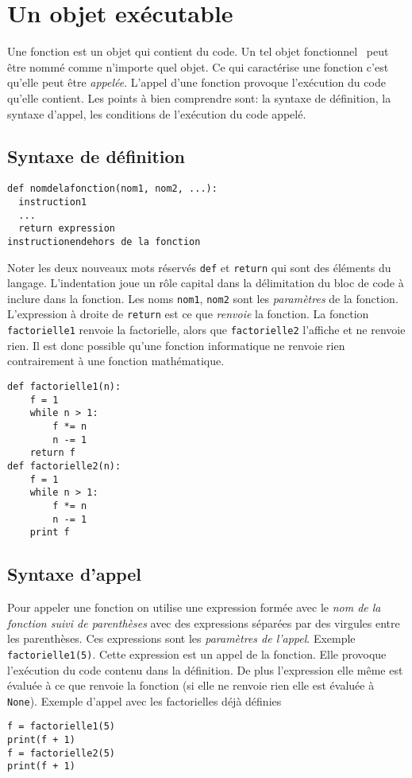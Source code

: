 

\section{Un objet exécutable}
Une fonction est un objet qui contient du code. Un tel objet \og fonctionnel\fg~ peut être nommé comme n'importe quel objet. Ce qui caractérise une fonction c'est qu'elle peut être \emph{appelée}. L'appel d'une fonction provoque l'exécution du code qu'elle contient. Les points à bien comprendre sont: la syntaxe de définition, la syntaxe d'appel, les conditions de l'exécution du code appelé.
\subsection{Syntaxe de définition}
\begin{verbatim}
def nomdelafonction(nom1, nom2, ...):
  instruction1
  ...
  return expression
instructionendehors de la fonction
\end{verbatim}
Noter les deux nouveaux mots réservés \verb|def| et \verb|return| qui sont des éléments du langage. L'indentation joue un rôle capital dans la délimitation du bloc de code à inclure dans la fonction. 
Les noms \verb|nom1|, \verb|nom2| sont les \emph{paramètres}  de la fonction. L'expression à droite de \verb|return| est ce que \emph{renvoie} la fonction.\newline
La fonction \texttt{factorielle1} renvoie la factorielle, alors que \texttt{factorielle2} l'affiche et ne renvoie rien. Il est donc possible qu'une fonction informatique ne renvoie rien contrairement à une fonction mathématique.
\begin{verbatim}
def factorielle1(n):
    f = 1
    while n > 1:
        f *= n
        n -= 1
    return f
def factorielle2(n):
    f = 1
    while n > 1:
        f *= n
        n -= 1
    print f
\end{verbatim}

\subsection{Syntaxe d'appel}
Pour appeler une fonction on utilise une expression formée avec le \emph{nom de la fonction suivi de parenthèses} avec des expressions séparées par des virgules entre les parenthèses. Ces expressions sont les \emph{paramètres de l'appel}. Exemple \verb|factorielle1(5)|. Cette expression est un appel de la fonction. Elle provoque l'exécution du code contenu dans la définition. De plus l'expression elle même est évaluée à ce que renvoie la fonction (si elle ne renvoie rien elle est évaluée à \verb|None|).\newline
Exemple d'appel avec les factorielles déjà définies
\begin{verbatim}
f = factorielle1(5)
print(f + 1)
f = factorielle2(5)
print(f + 1)
\end{verbatim}


